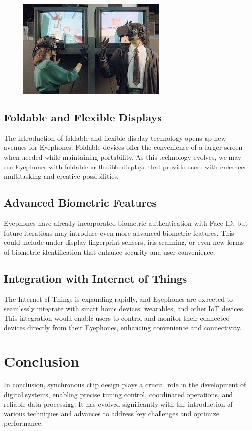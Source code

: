 \documentclass[a4paper,11pt]{report}
\begin{document}
 \begin{figure}[h]
	\centering
	\hspace{21pt}
	\includegraphics[width=.70\linewidth]{eyephone0.jpg}
\end{figure}

\section{Foldable and Flexible Displays}
The introduction of foldable and flexible display technology opens up new avenues for Eyephones. Foldable devices offer the convenience of a larger screen when needed while maintaining portability. As this technology evolves, we may see Eyephones with foldable or flexible displays that provide users with enhanced multitasking and creative possibilities.

\section{Advanced Biometric Features}
Eyephones have already incorporated biometric authentication with Face ID, but future iterations may introduce even more advanced biometric features. This could include under-display fingerprint sensors, iris scanning, or even new forms of biometric identification that enhance security and user convenience.

\section{Integration with Internet of Things}
The Internet of Things is expanding rapidly, and Eyephones are expected to seamlessly integrate with smart home devices, wearables, and other IoT devices. This integration would enable users to control and monitor their connected devices directly from their Eyephones, enhancing convenience and connectivity.

\chapter{Conclusion}
In conclusion, synchronous chip design plays a crucial role in the development of digital systems, enabling precise timing control, coordinated operations, and reliable data processing. It has evolved significantly with the introduction of various techniques and advances to address key challenges and optimize performance.
\end{document}
